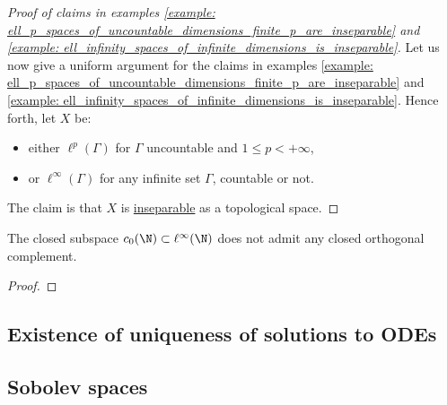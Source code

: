         \begin{proof}[Proof of claims in examples \ref{example: ell_p_spaces_of_uncountable_dimensions_finite_p_are_inseparable} and \ref{example: ell_infinity_spaces_of_infinite_dimensions_is_inseparable}]
            Let us now give a uniform argument for the claims in examples \ref{example: ell_p_spaces_of_uncountable_dimensions_finite_p_are_inseparable} and \ref{example: ell_infinity_spaces_of_infinite_dimensions_is_inseparable}. Hence forth, let $X$ be:
            \begin{itemize}
                \item either $\ell^p(\Gamma)$ for $\Gamma$ uncountable and $1 \leq p < +\infty$,
                \item or $\ell^{\infty}(\Gamma)$ for any infinite set $\Gamma$, countable or not.
            \end{itemize}
            The claim is that $X$ is \underline{inseparable} as a topological space.

        \end{proof}

        \begin{proposition}
            The closed subspace $c_0(\N) \subset \ell^{\infty}(\N)$ does not admit any closed orthogonal complement.
        \end{proposition}
            \begin{proof}
                
            \end{proof}

    \subsection{Existence of uniqueness of solutions to ODEs}

    \subsection{Sobolev spaces}